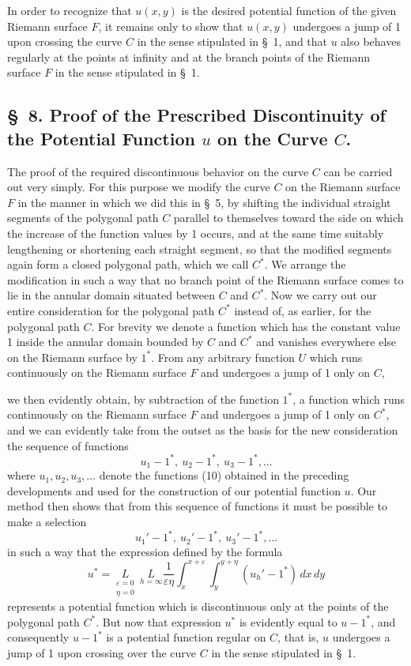 \documentclass{article}
\begin{document}
In order to recognize that $u(x, y)$ is the desired potential function of the given Riemann surface $F$, it remains only to show that $u(x, y)$ undergoes a jump of 1 upon crossing the curve $C$ in the sense stipulated in §~1, and that $u$ also behaves regularly at the points at infinity and at the branch points of the Riemann surface $F$ in the sense stipulated in §~1.

\subsection*{§~8. Proof of the Prescribed Discontinuity of the Potential Function $u$ on the Curve $C$.}

The proof of the required discontinuous behavior on the curve $C$ can be carried out very simply. For this purpose we modify the curve $C$ on the Riemann surface $F$ in the manner in which we did this in §~5, by shifting the individual straight segments of the polygonal path $C$ parallel to themselves toward the side on which the increase of the function values by 1 occurs, and at the same time suitably lengthening or shortening each straight segment, so that the modified segments again form a closed polygonal path, which we call $C^*$. We arrange the modification in such a way that no branch point of the Riemann surface comes to lie in the annular domain situated between $C$ and $C^*$. Now we carry out our entire consideration for the polygonal path $C^*$ instead of, as earlier, for the polygonal path $C$. For brevity we denote a function which has the constant value 1 inside the annular domain bounded by $C$ and $C^*$ and vanishes everywhere else on the Riemann surface by $1^*$. From any arbitrary function $U$ which runs continuously on the Riemann surface $F$ and undergoes a jump of 1 only on $C$,

we then evidently obtain, by subtraction of the function $1^*$, a function which runs continuously on the Riemann surface $F$ and undergoes a jump of 1 only on $C^*$, and we can evidently take from the outset as the basis for the new consideration the sequence of functions
\[
u_1 - 1^*, \ u_2 - 1^*, \ u_3 - 1^*, \dots
\]
where $u_1, u_2, u_3, \dots$ denote the functions (10) obtained in the preceding developments and used for the construction of our potential function $u$. Our method then shows that from this sequence of functions it must be possible to make a selection
\[
u_1' - 1^*, \ u_2' - 1^*, \ u_3' - 1^*, \dots
\]
in such a way that the expression defined by the formula
\[
u^* = \underset{\substack{\varepsilon=0 \\ \eta=0}}{L} \ \underset{h=\infty}{L} \frac{1}{\varepsilon\eta} \int_x^{x+\varepsilon} \int_y^{y+\eta} (u_h' - 1^*)\,dx\,dy
\]
represents a potential function which is discontinuous only at the points of the polygonal path $C^*$. But now that expression $u^*$ is evidently equal to $u - 1^*$, and consequently $u - 1^*$ is a potential function regular on $C$, that is, $u$ undergoes a jump of 1 upon crossing over the curve $C$ in the sense stipulated in §~1.
\end{document}
